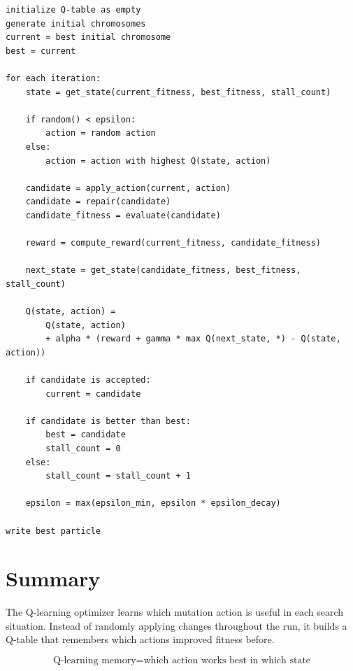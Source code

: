\documentclass[11pt]{article}
\begin{document}
\begin{lstlisting}
initialize Q-table as empty
generate initial chromosomes
current = best initial chromosome
best = current

for each iteration:
    state = get_state(current_fitness, best_fitness, stall_count)

    if random() < epsilon:
        action = random action
    else:
        action = action with highest Q(state, action)

    candidate = apply_action(current, action)
    candidate = repair(candidate)
    candidate_fitness = evaluate(candidate)

    reward = compute_reward(current_fitness, candidate_fitness)

    next_state = get_state(candidate_fitness, best_fitness, stall_count)

    Q(state, action) =
        Q(state, action)
        + alpha * (reward + gamma * max Q(next_state, *) - Q(state, action))

    if candidate is accepted:
        current = candidate

    if candidate is better than best:
        best = candidate
        stall_count = 0
    else:
        stall_count = stall_count + 1

    epsilon = max(epsilon_min, epsilon * epsilon_decay)

write best particle
\end{lstlisting}

\section{Summary}

The Q-learning optimizer learns which mutation action is useful in each search
situation. Instead of randomly applying changes throughout the run, it builds a
Q-table that remembers which actions improved fitness before.

\[
\text{Q-learning memory}
=
\text{which action works best in which state}
\]
\end{document}
